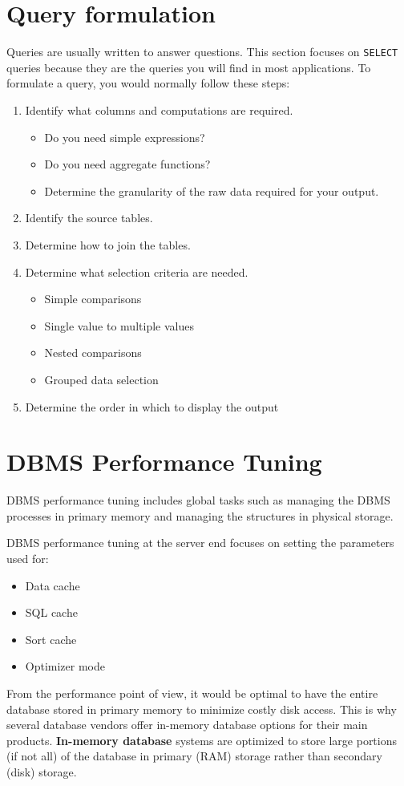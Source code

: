 \documentclass[a4paper, 11pt, titlepage]{report}
\begin{document}
\section{Query formulation}
Queries are usually written to answer questions. This section focuses on \texttt{SELECT} queries because they are the queries you will find in most applications. To formulate a query, you would normally follow these steps:
\begin{enumerate}
\item Identify what columns and computations are required.
\begin{itemize}
\item Do you need simple expressions?
\item Do you need aggregate functions?
\item Determine the granularity of the raw data required for your output.
\end{itemize}
\item Identify the source tables.
\item Determine how to join the tables.
\item Determine what selection criteria are needed.
\begin{itemize}
\item Simple comparisons
\item Single value to multiple values
\item Nested comparisons
\item Grouped data selection
\end{itemize}
\item Determine the order in which to display the output
\end{enumerate}
\section{DBMS Performance Tuning}
DBMS performance tuning includes global tasks such as managing the DBMS processes in primary memory and managing the structures in physical storage.

DBMS performance tuning at the server end focuses on setting the parameters used for:
\begin{itemize}
\item Data cache
\item SQL cache
\item Sort cache
\item Optimizer mode
\end{itemize}

\pagebreak
From the performance point of view, it would be optimal to have the entire database stored in primary memory to minimize costly disk access. This is why several database vendors offer in-memory database options for their main products. \textbf{In-memory database} systems are optimized to store large portions (if not all) of the database in primary (RAM) storage rather than secondary (disk) storage.
\end{document}
